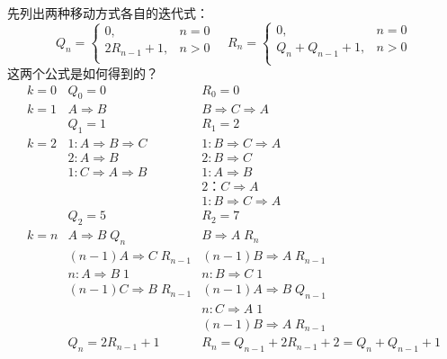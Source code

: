 \begin{answer}
	先列出两种移动方式各自的迭代式：
	\begin{equation*}
		Q_{n} = \left\{
		\begin{array}{ll}
			0 ,& n = 0 \\
			2R_{n-1}+1 ,& n>0\\
		\end{array}
		\right. \quad
		R_{n} = \left\{
		\begin{array}{ll}
			0 ,& n = 0 \\
			Q_{n}+Q_{n-1}+1 ,& n>0\\
		\end{array}
		\right.
	\end{equation*}
	这两个公式是如何得到的？
	\begin{equation*}
		\begin{array}{lll}
			k=0 & Q_{0} = 0		 					& R_{0} = 0 \\
			k=1 & A \Rightarrow B	 				& B \Rightarrow C \Rightarrow A \\
				& Q_1=1 							& R_1 = 2\\
			k=2 & 1: A \Rightarrow B \Rightarrow C 	& 1: B \Rightarrow C \Rightarrow A \\
				& 2: A \Rightarrow B 				& 2: B \Rightarrow C \\
				& 1: C \Rightarrow A \Rightarrow B  & 1: A \Rightarrow B \\
				& 									& 2：C \Rightarrow A \\
				&									& 1: B \Rightarrow C \Rightarrow A \\
				& Q_{2} = 5							& R_{2} = 7 \\
			k=n & A \Rightarrow B	\; Q_n			& B \Rightarrow A\; R_n\\
				& (n-1) A \Rightarrow C	\;R_{n-1}	& (n-1) B \Rightarrow A \; R_{n-1} \\
				& n: A \Rightarrow B	\;1			& n: B \Rightarrow C 	\; 1 \\
				& (n-1) C \Rightarrow B \;R_{n-1}	& (n-1) A \Rightarrow B \; Q_{n-1} \\
				& 									& n: C \Rightarrow A 	\; 1 \\
				& 									& (n-1) B \Rightarrow A \; R_{n-1} \\
				& Q_n = 2R_{n-1}+1					& R_{n} = Q_{n-1}+2R_{n-1}+2 = Q_{n}+Q_{n-1}+1\\
		\end{array}
	\end{equation*}
\end{answer}

